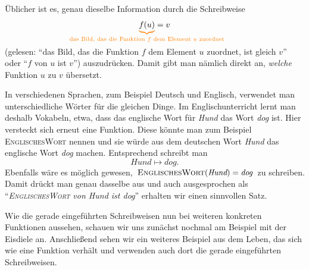 \documentclass[../../main.tex]{subfiles}
\begin{document}
Üblicher ist es, genau dieselbe Information durch die Schreibweise 
\[\colorbrace{f(u)}{\text{das~Bild,~das~die~Funktion~}f\text{~dem~Element~}u\text{~zuordnet}}=v\] 
(gelesen: \enquote{das Bild, das die Funktion $f$ dem Element $u$ zuordnet, ist gleich $v$} oder \enquote{$f$ von $u$ ist $v$}) auszudrücken. Damit gibt man nämlich direkt an, \emph{welche} Funktion $u$ zu $v$ übersetzt.

\begin{example}{}
    In verschiedenen Sprachen, zum Beispiel Deutsch und Englisch, verwendet man unterschiedliche Wörter für die gleichen Dinge. Im Englischunterricht lernt man deshalb Vokabeln, etwa, dass das englische Wort für \emph{Hund} das Wort \emph{dog} ist. Hier versteckt sich erneut eine Funktion. Diese könnte man zum Beispiel \textsc{EnglischesWort} nennen und sie würde aus dem deutschen Wort \emph{Hund} das englische Wort \emph{dog} machen. Entsprechend schreibt man
    \[\textit{Hund}\mapsto\textit{dog}.\]
    Ebenfalls wäre es möglich gewesen, $\textsc{EnglischesWort}(\textit{Hund})=\textit{dog}$ zu schreiben. Damit drückt man genau dasselbe aus und auch ausgesprochen als \enquote{\emph{\textsc{EnglischesWort} von Hund ist dog}} erhalten wir einen sinnvollen Satz.
\end{example}

Wie die gerade eingeführten Schreibweisen nun bei weiteren konkreten Funktionen aussehen, schauen wir uns zunächst nochmal am Beispiel mit der Eisdiele an. Anschließend sehen wir ein weiteres Beispiel aus dem Leben, das sich wie eine Funktion verhält und verwenden auch dort die gerade eingeführten Schreibweisen.
\end{document}
